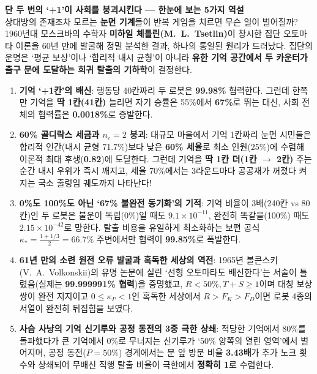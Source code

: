 \documentclass[11pt,a4paper]{article}
\begin{document}
\begin{tcolorbox}[colback=softbg,colframe=navy,boxrule=0.7pt,arc=3pt,left=12pt,right=12pt,top=8pt,bottom=8pt]
\textbf{\sffamily 단 두 번의 `+1'이 사회를 붕괴시킨다 --- 한눈에 보는 5가지 역설}\\[0.25em]
상대방의 존재조차 모르는 \textbf{눈먼 기계}들이 반복 게임을 치르면 무슨 일이 벌어질까? 1960년대 모스크바의 수학자 \textbf{미하일 체틀린(M.~L.~Tsetlin)}이 창시한 집단 오토마타 이론을 60년 만에 발굴해 정밀 분석한 결과, 하나의 통일된 원리가 드러났다. 집단의 운명은 `평균 보상'이나 `합리적 내시 균형'이 아니라 \textbf{유한 기억 공간에서 두 카운터가 출구 문에 도달하는 희귀 탈출의 기하학}이 결정한다.
\begin{enumerate}
  \item \textbf{기억 `+1칸'의 배신}: 행동당 40칸짜리 두 로봇은 \textbf{99.98\%} 협력한다. 그런데 한쪽만 기억을 \textbf{딱 1칸(41칸)} 늘리면 자기 승률은 55\%에서 \textbf{67\%}로 뛰는 대신, 사회 전체의 협력률은 \textbf{0.0018\%}로 증발한다.
  \item \textbf{60\% 골디락스 세금과 $n_c=2$ 붕괴}: 대규모 마을에서 기억 1칸짜리 눈먼 시민들은 합리적 인간(내시 균형 71.7\%)보다 낮은 \textbf{60\% 세율}로 최소 인원(25\%)에 수렴해 이론적 최대 후생(\textbf{0.82})에 도달한다. 그런데 기억을 \textbf{딱 1칸 더(1칸 $\to$ 2칸)} 주는 순간 내시 우위가 즉시 깨지고, 세율 70\%에서는 3라운드마다 공공재가 꺼졌다 켜지는 국소 출렁임 궤도까지 나타난다!
  \item \textbf{0\%도 100\%도 아닌 `67\% 불완전 동기화'의 기적}: 기억 비율이 3배(240칸 vs 80칸)인 두 로봇은 불운이 독립(0\%)일 때도 $9.1\times 10^{-11}$, 완전히 똑같을(100\%) 때도 $2.15\times 10^{-42}$로 망한다. 탈출 비용을 유일하게 최소화하는 보편 공식 $\kappa_* = \frac{1+1/3}{2} = \mathbf{66.7\%}$ 주변에서만 협력이 \textbf{99.85\%}로 폭발한다.
  \item \textbf{61년 만의 소련 원전 오류 발굴과 혹독한 세상의 역전}: 1965년 볼콘스키(V.~A.~Volkonskii)의 유명 논문에 실린 `선형 오토마타도 배신한다'는 서술이 틀렸음(실제는 \textbf{99.999991\% 협력})을 증명했고, $R<50\%, T+S \ge 1$이며 대칭 보상 쌍이 완전 지지이고 $0 \le \kappa_P < 1$인 혹독한 세상에서 $R > F_K > F_D$이면 로봇 4종의 서열이 완전히 뒤집힘을 보였다.
  \item \textbf{사슴 사냥의 기억 신기루와 공정 동전의 3중 극한 상쇄}: 적당한 기억에서 80\%를 돌파했다가 큰 기억에서 0\%로 무너지는 신기루가 `50\% 양쪽의 열린 영역'에서 벌어지며, 공정 동전($P=50\%$) 경계에서는 문 앞 방문 비율 \textbf{3.43배}가 추가 노크 횟수와 상쇄되어 무배신 직행 탈출 비율이 극한에서 \textbf{정확히 1}로 수렴한다.
\end{enumerate}
\end{tcolorbox}
\end{document}
